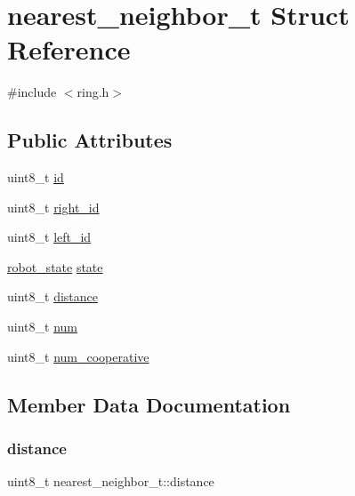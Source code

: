 \hypertarget{structnearest__neighbor__t}{}\section{nearest\+\_\+neighbor\+\_\+t Struct Reference}
\label{structnearest__neighbor__t}


{\ttfamily \#include $<$ring.\+h$>$}

\subsection*{Public Attributes}
\begin{DoxyCompactItemize}
\item 
uint8\+\_\+t \hyperlink{structnearest__neighbor__t_a5066463b41970a48266d868b25c9c211}{id}
\item 
uint8\+\_\+t \hyperlink{structnearest__neighbor__t_af02c019de642bf55bdf9a4126fbcf834}{right\+\_\+id}
\item 
uint8\+\_\+t \hyperlink{structnearest__neighbor__t_a984e7811a540a37d34dafd2644e0dc88}{left\+\_\+id}
\item 
\hyperlink{ring_8h_a69b20b1a04c8e4cf3b72851b966259ec}{robot\+\_\+state} \hyperlink{structnearest__neighbor__t_a6888323805aed698b5485548a6b17390}{state}
\item 
uint8\+\_\+t \hyperlink{structnearest__neighbor__t_ae89e1b1120b55df59443ab6f743d95d9}{distance}
\item 
uint8\+\_\+t \hyperlink{structnearest__neighbor__t_a2281e5dac12c7cd3c84d4902077d84c9}{num}
\item 
uint8\+\_\+t \hyperlink{structnearest__neighbor__t_a1067d90cd055d66e9657dfa1dfe76202}{num\+\_\+cooperative}
\end{DoxyCompactItemize}


\subsection{Member Data Documentation}
\mbox{\label{structnearest__neighbor__t_ae89e1b1120b55df59443ab6f743d95d9}} 
\subsubsection{\texorpdfstring{distance}{distance}}
{\footnotesize\ttfamily uint8\+\_\+t nearest\+\_\+neighbor\+\_\+t\+::distance}


